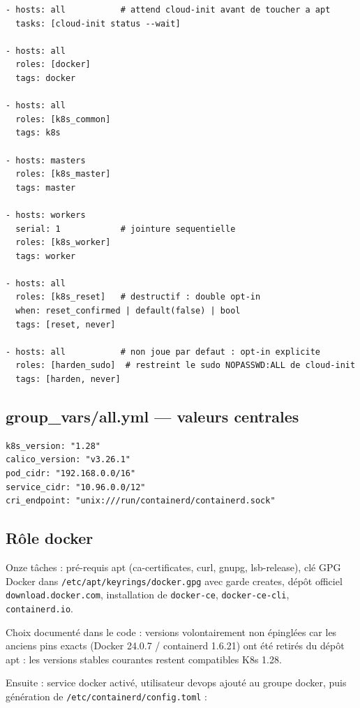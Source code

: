 \documentclass[12pt,a4paper,twoside,openright]{report}
\begin{document}
\begin{lstlisting}[caption={playbook.yml : structure globale}]
- hosts: all           # attend cloud-init avant de toucher a apt
  tasks: [cloud-init status --wait]

- hosts: all
  roles: [docker]
  tags: docker

- hosts: all
  roles: [k8s_common]
  tags: k8s

- hosts: masters
  roles: [k8s_master]
  tags: master

- hosts: workers
  serial: 1            # jointure sequentielle
  roles: [k8s_worker]
  tags: worker

- hosts: all
  roles: [k8s_reset]   # destructif : double opt-in
  when: reset_confirmed | default(false) | bool
  tags: [reset, never]

- hosts: all           # non joue par defaut : opt-in explicite
  roles: [harden_sudo]  # restreint le sudo NOPASSWD:ALL de cloud-init
  tags: [harden, never]
\end{lstlisting}

\subsection{group\_vars/all.yml --- valeurs centrales}
\begin{lstlisting}[caption={Paramètres cluster partagés par tous les rôles}]
k8s_version: "1.28"
calico_version: "v3.26.1"
pod_cidr: "192.168.0.0/16"
service_cidr: "10.96.0.0/12"
cri_endpoint: "unix:///run/containerd/containerd.sock"
\end{lstlisting}

\subsection{Rôle docker}
Onze tâches : pré-requis apt (ca-certificates, curl, gnupg, lsb-release), clé GPG Docker dans \texttt{/etc/apt/keyrings/docker.gpg} avec garde creates, dépôt officiel \texttt{download.docker.com}, installation de \texttt{docker-ce}, \texttt{docker-ce-cli}, \texttt{containerd.io}.

Choix documenté dans le code : versions volontairement non épinglées car les anciens pins exacts (Docker 24.0.7 / containerd 1.6.21) ont été retirés du dépôt apt : les versions stables courantes restent compatibles K8s 1.28.

Ensuite : service docker activé, utilisateur devops ajouté au groupe docker, puis génération de \texttt{/etc/containerd/config.toml} :
\end{document}
